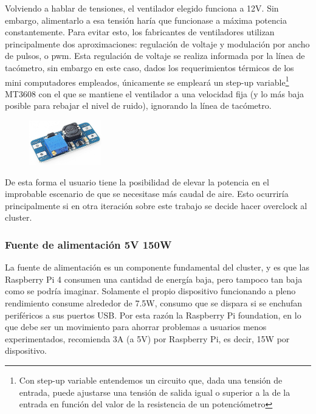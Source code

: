 Volviendo a hablar de tensiones, el ventilador elegido funciona a 12V. Sin embargo, alimentarlo a esa tensión haría que funcionase a máxima potencia constantemente. Para evitar esto, los fabricantes de ventiladores utilizan principalmente dos aproximaciones: regulación de voltaje y modulación por ancho de pulsos, o \acrshort{pwm}. Esta regulación de voltaje se realiza informada por la línea de tacómetro, sin embargo en este caso, dados los requerimientos térmicos de los mini computadores empleados, únicamente se empleará un step-up variable\footnote{Con step-up variable entendemos un circuito que, dada una tensión de entrada, puede ajustarse una tensión de salida igual o superior a la de la entrada en función del valor de la resistencia de un potenciómetro} MT3608 con el que se mantiene el ventilador a una velocidad fija (y lo más baja posible para rebajar el nivel de ruido), ignorando la línea de tacómetro.\hfill\ \ \begin{figure}
  \centering
  \includegraphics[width=0.28\textwidth]{img/step-up.jpg}
  \label{fig:step-up}
\end{figure}De esta forma el usuario tiene la posibilidad de elevar la potencia en el improbable escenario de que se necesitase más caudal de aire. Esto ocurriría principalmente si en otra iteración sobre este trabajo se decide hacer overclock al cluster.

\subsubsection{Fuente de alimentación 5V 150W}
La fuente de alimentación es un componente fundamental del cluster, y es que las Raspberry Pi 4 consumen una cantidad de energía baja, pero tampoco tan baja como se podría imaginar. Solamente el propio dispositivo funcionando a pleno rendimiento consume alrededor de 7.5W, consumo que se dispara si se enchufan periféricos a sus puertos USB. Por esta razón la Raspberry Pi foundation, en lo que debe ser un movimiento para ahorrar problemas a usuarios menos experimentados, recomienda 3A (a 5V) por Raspberry Pi, es decir, 15W por dispositivo.\cite{raspberrypi_power-requirements}

